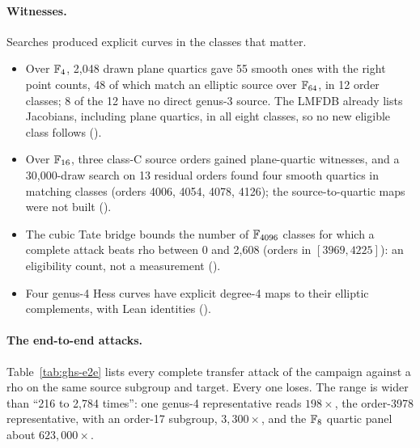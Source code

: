 \paragraph{Witnesses.} Searches produced explicit curves in the classes
that matter.
\begin{itemize}
\item Over $\mathbb{F}_4$, 2{,}048 drawn plane quartics gave 55 smooth ones with
  the right point counts, 48 of which match an elliptic source over
  $\mathbb{F}_{64}$, in 12 order classes; 8 of the 12 have no direct genus-3
  source. The LMFDB already lists Jacobians, including plane quartics, in
  all eight classes, so no new eligible class follows
  ().
\item Over $\mathbb{F}_{16}$, three class-C source orders gained plane-quartic
  witnesses, and a 30{,}000-draw search on 13 residual orders found four
  smooth quartics in matching classes (orders 4006, 4054, 4078, 4126); the
  source-to-quartic maps were not built
  ().
\item The cubic Tate bridge bounds the number of $\mathbb{F}_{4096}$ classes for
  which a complete attack beats rho between 0 and 2{,}608 (orders in
  $[3969,4225]$): an eligibility count, not a measurement
  ().
\item Four genus-4 Hess curves have explicit degree-4 maps to their
  elliptic complements, with Lean identities
  ().
\end{itemize}

\paragraph{The end-to-end attacks.} Table~\ref{tab:ghs-e2e} lists every
complete transfer attack of the campaign against a rho on the same source
subgroup and target. Every one loses. The range is wider than ``216 to
2{,}784 times'': one genus-4 representative reads $198\times$, the
order-3978 representative, with an order-17 subgroup, $3{,}300\times$, and
the $\mathbb{F}_8$ quartic panel about $623{,}000\times$.

